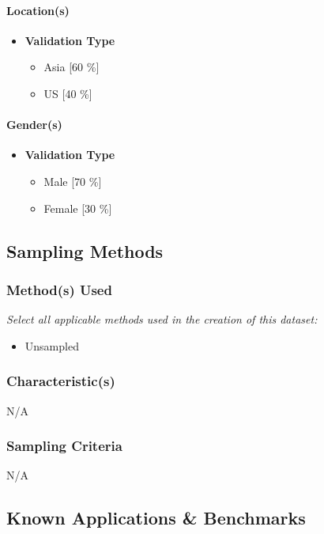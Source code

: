 \paragraph{Location(s)}
\begin{itemize}
    \item \textbf{Validation Type}
    \begin{itemize}
        \item Asia [60 \%]
        \item US [40 \%]
    \end{itemize}
\end{itemize}

\paragraph{Gender(s)}
\begin{itemize}
    \item \textbf{Validation Type}
    \begin{itemize}
        \item Male [70 \%]
        \item Female [30 \%]
    \end{itemize}
\end{itemize}

\subsection{Sampling Methods}
\subsubsection{Method(s) Used}
\textit{Select all applicable methods used in the creation of this dataset:}
\begin{itemize}
    \item Unsampled
\end{itemize}

\subsubsection{Characteristic(s)}
N/A

\subsubsection{Sampling Criteria}
N/A

\subsection{Known Applications \& Benchmarks}
